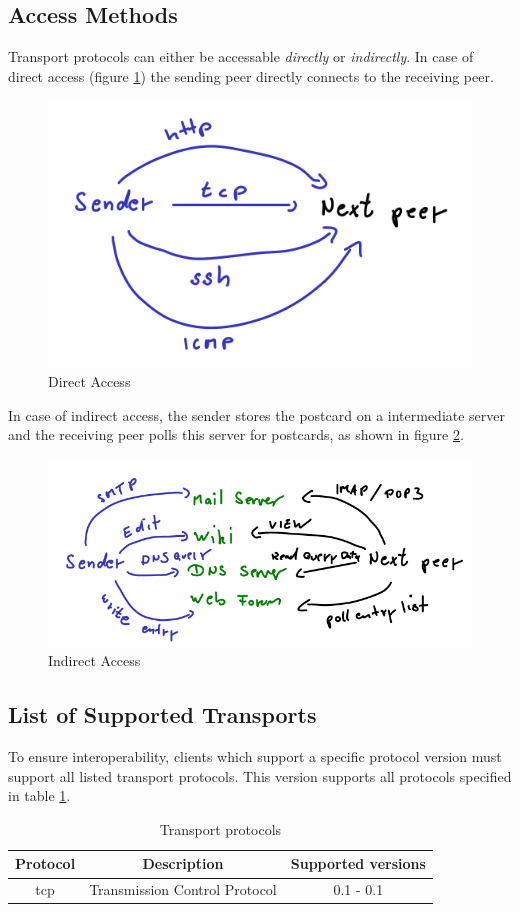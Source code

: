 \subsection{Access Methods}
\label{accessmethods}
Transport protocols can either be accessable \textit{directly} or 
\textit{indirectly}. In case of direct access (figure \ref{directaccess})
the sending peer directly connects to the receiving peer.
\begin{figure}
    \centering
    \caption{Direct Access}
    \label{directaccess}
    \includegraphics[scale=0.8]{directaccess.png}
\end{figure}
In case of indirect access, the sender stores the postcard on a intermediate
server and the receiving peer polls this server for postcards, as shown
in figure \ref{indirectaccess}.
\begin{figure}
    \centering
    \caption{Indirect Access}
    \label{indirectaccess}
    \includegraphics[scale=0.8]{indirectaccess.png}
\end{figure}
\subsection{List of Supported Transports}
To ensure interoperability, clients which support a specific
protocol version must support all listed transport protocols. This version
supports all protocols specified in table \ref{transportprotocollisting}.
\begin{longtable}{|c|c|c|}
\caption{Transport protocols}
\label{transportprotocollisting}
\\
\hline
\textbf{Protocol} & \textbf{Description} & \textbf{Supported versions}\\
\hline
tcp & Transmission Control Protocol & 0.1 - 0.1\\
\hline
\end{longtable}

